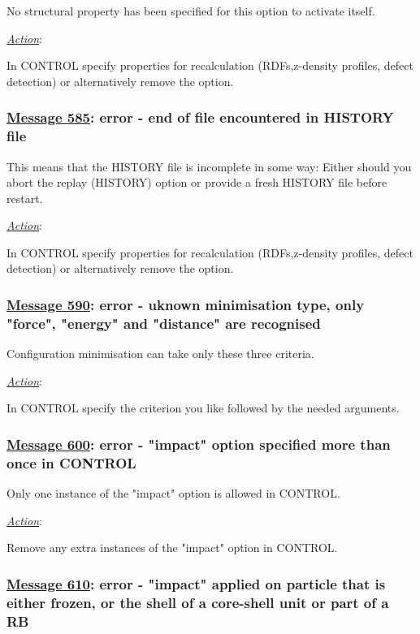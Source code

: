 No structural property has been specified for this option to
activate itself.

\noindent \underline{\em Action}:

In CONTROL specify properties for recalculation (RDFs,z-density
profiles, defect detection) or alternatively remove the option.

\subsubsection*{\underline{Message 585}: error - end of file encountered in HISTORY file}

This means that the HISTORY file is incomplete in some way: Either
should you abort the replay (HISTORY) option or provide a fresh
HISTORY file before restart.

\noindent \underline{\em Action}:

In CONTROL specify properties for recalculation (RDFs,z-density
profiles, defect detection) or alternatively remove the option.

\subsubsection*{\underline{Message 590}: error - uknown minimisation type, only "force", "energy" and "distance" are recognised}

Configuration minimisation can take only these three criteria.

\noindent \underline{\em Action}:

In CONTROL specify the criterion you like followed by the needed arguments.

\subsubsection*{\underline{Message 600}: error - "impact" option specified more than once in CONTROL}

Only one instance of the "impact" option is allowed in CONTROL.

\noindent \underline{\em Action}:

Remove any extra instances of the "impact" option in CONTROL.

\subsubsection*{\underline{Message 610}: error - "impact" applied on particle that is either frozen, or the shell of a core-shell unit or part of a RB}

